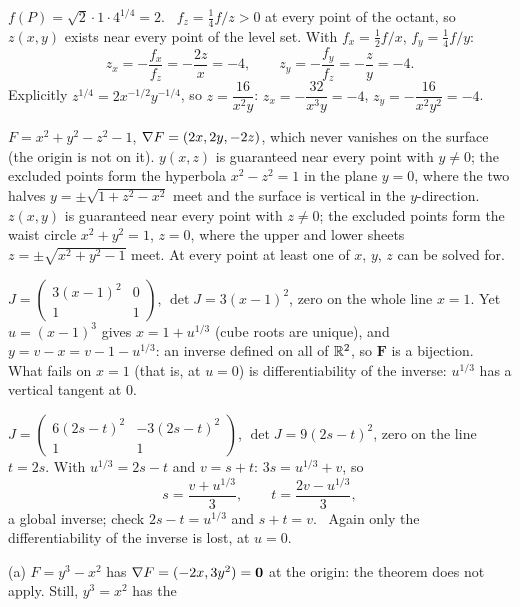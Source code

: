 \begin{solutions}
  \item $f(P)=\sqrt2\cdot1\cdot4^{1/4}=2$. \checkmark\
        $f_{z}=\tfrac14f/z>0$ at every point of the octant, so $z(x,y)$
        exists near every point of the level set. With $f_{x}=\tfrac12f/x$,
        $f_{y}=\tfrac14f/y$:
        \[
          z_{x}=-\frac{f_{x}}{f_{z}}=-\frac{2z}{x}=-4,\qquad
          z_{y}=-\frac{f_{y}}{f_{z}}=-\frac{z}{y}=-4 .
        \]
        Explicitly $z^{1/4}=2x^{-1/2}y^{-1/4}$, so $z=\dfrac{16}{x^{2}y}$:
        $z_{x}=-\dfrac{32}{x^{3}y}=-4$, $z_{y}=-\dfrac{16}{x^{2}y^{2}}=-4$.
        \checkmark
  \item $F=x^{2}+y^{2}-z^{2}-1$, $\nabla F=(2x,2y,-2z)$, which never
        vanishes on the surface (the origin is not on it).
        $y(x,z)$ is guaranteed near every point with $y\neq0$; the excluded
        points form the hyperbola $x^{2}-z^{2}=1$ in the plane $y=0$, where
        the two halves $y=\pm\sqrt{1+z^{2}-x^{2}}$ meet and the surface is
        vertical in the $y$-direction. $z(x,y)$ is guaranteed near every
        point with $z\neq0$; the excluded points form the waist circle
        $x^{2}+y^{2}=1$, $z=0$, where the upper and lower sheets
        $z=\pm\sqrt{x^{2}+y^{2}-1}$ meet. At every point at least one of
        $x$, $y$, $z$ can be solved for.
  \item $J=\begin{pmatrix}3(x-1)^{2}&0\\1&1\end{pmatrix}$,
        $\det J=3(x-1)^{2}$, zero on the whole line $x=1$. Yet
        $u=(x-1)^{3}$ gives $x=1+u^{1/3}$ (cube roots are unique), and
        $y=v-x=v-1-u^{1/3}$: an inverse defined on all of $\mathbb{R}^{2}$, so
        $\mathbf{F}$ is a bijection. What fails on $x=1$ (that is, at
        $u=0$) is differentiability of the inverse: $u^{1/3}$ has a
        vertical tangent at $0$.
  \item $J=\begin{pmatrix}6(2s-t)^{2}&-3(2s-t)^{2}\\1&1\end{pmatrix}$,
        $\det J=9(2s-t)^{2}$, zero on the line $t=2s$. With $u^{1/3}=2s-t$
        and $v=s+t$: $3s=u^{1/3}+v$, so
        \[
          s=\frac{v+u^{1/3}}{3},\qquad t=\frac{2v-u^{1/3}}{3},
        \]
        a global inverse; check $2s-t=u^{1/3}$ and $s+t=v$. \checkmark\
        Again only the differentiability of the inverse is lost, at $u=0$.
  \item (a) $F=y^{3}-x^{2}$ has $\nabla F=(-2x,3y^{2})=\mathbf{0}$ at the
        origin: the theorem does not apply. Still, $y^{3}=x^{2}$ has the

\end{solutions}

